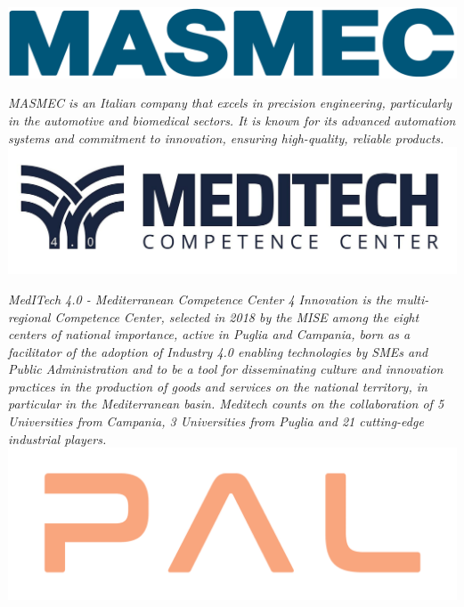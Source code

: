 \documentclass[
	openany, %
	parskip=full, %
	12pt, %
	a4paper, %
]{conferencebooklet} %
\begin{document}
\begin{multicols*}{2}
    \hfill\includegraphics[width=\sponsorscaling\linewidth]{logos/masmec.png}\hspace*{\fill}
    
    \textit{MASMEC is an Italian company that excels in precision engineering, particularly in the automotive and biomedical sectors. It is known for its advanced automation systems and commitment to innovation, ensuring high-quality, reliable products.} \\

    \hfill\includegraphics[width=\sponsorscaling\linewidth]{logos/meditech.jpg}\hspace*{\fill}

    \textit{MedITech 4.0 - Mediterranean Competence Center 4 Innovation is the multi-regional Competence Center, selected in 2018 by the MISE among the eight centers of national importance, active in Puglia and Campania, born as a facilitator of the adoption of Industry 4.0 enabling technologies by SMEs and Public Administration and to be a tool for disseminating culture and innovation practices in the production of goods and services on the national territory, in particular in the Mediterranean basin.   Meditech counts on the collaboration of 5 Universities from Campania, 3 Universities from Puglia and 21 cutting-edge industrial players.} \\   

    \hfill\includegraphics[width=\sponsorscaling\linewidth]{logos/pal.png}\hspace*{\fill}
    

\end{multicols*}
\end{document}

